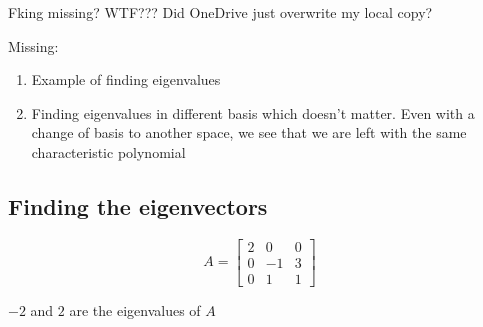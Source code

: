 \begin{example}
	Fking missing? WTF??? Did OneDrive just overwrite my local copy?

	Missing:
	\begin{enumerate}
		\item Example of finding eigenvalues
		\item Finding eigenvalues in different basis which doesn't matter. Even with a change of basis to another space, we see that we are left with the same characteristic polynomial
	\end{enumerate}
\end{example}

\subsection{Finding the eigenvectors}

\begin{example}
	\[A = \begin{bmatrix}
		2&0&0\\0&-1&3\\0&1&1
	\end{bmatrix}\]

	$-2$ and $2$ are the eigenvalues of $A$
	
\end{example}

